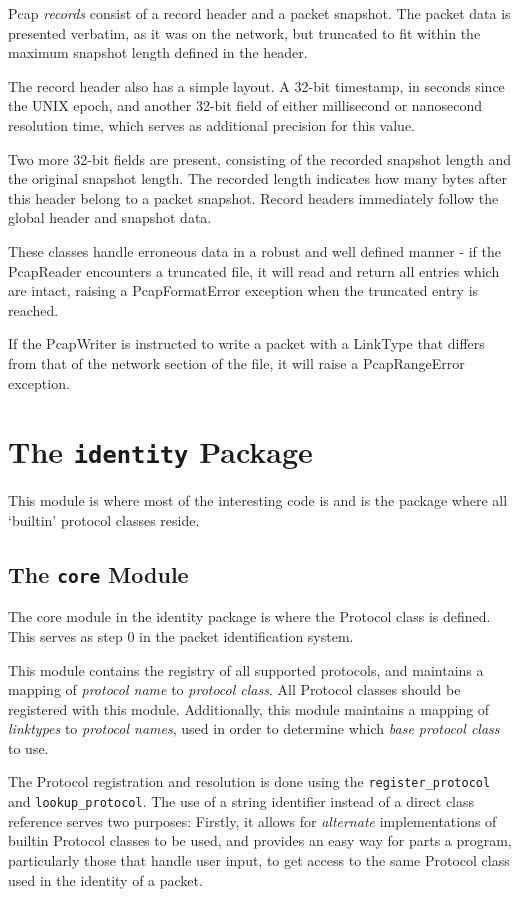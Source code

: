 \documentclass[10pt,a4paper,notitlepage]{report}
\begin{document}
Pcap \emph{records} consist of a record header and a packet snapshot. The packet data is presented verbatim, as it was on the network, but truncated to fit within the maximum snapshot length defined in the header.

The record header also has a simple layout. A 32-bit timestamp, in seconds since the UNIX epoch, and another 32-bit field of either millisecond or nanosecond resolution time, which serves as additional precision for this value.

Two more 32-bit fields are present, consisting of the recorded snapshot length and the original snapshot length. The recorded length indicates how many bytes after this header belong to a packet snapshot. Record headers immediately follow the global header and snapshot data.

These classes handle erroneous data in a robust and well defined manner - if the PcapReader encounters a truncated file, it will read and return all entries which are intact, raising a PcapFormatError exception when the truncated entry is reached.
 
If the PcapWriter is instructed to write a packet with a LinkType that differs from that of the network section of the file, it will raise a PcapRangeError exception.

\section{The \texttt{identity} Package}
This module is where most of the interesting code is and is the package where all `builtin' protocol classes reside.

\subsection{The \texttt{core} Module}
The core module in the identity package is where the Protocol class is defined. This serves as step 0 in the packet identification system.

This module contains the registry of all supported protocols, and maintains a mapping of \emph{protocol name} to \emph{protocol class}. All Protocol classes should be registered with this module. Additionally, this module maintains a mapping of \emph{linktypes} to \emph{protocol names}, used in order to determine  which \emph{base protocol class} to use.

The Protocol registration and resolution is done using the \texttt{register_protocol} and \texttt{lookup_protocol}. The use of a string identifier instead of a direct class reference serves two purposes: Firstly, it allows for \emph{alternate} implementations of builtin Protocol classes to be used, and provides an easy way for parts a program, particularly those that handle user input, to get access to the same Protocol class used in the identity of a packet.
\end{document}
